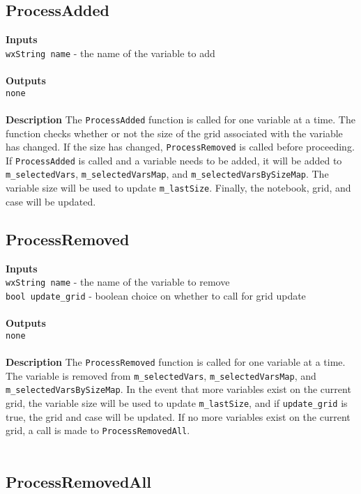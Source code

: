 \documentclass[11pt]{article} %
\begin{document}
\subsection{ProcessAdded}
\textbf{Inputs} \\
\texttt{wxString name} - the name of the variable to add \\
\\
\textbf{Outputs}\\
\texttt{none} \\
\\
\textbf{Description}
The \texttt{ProcessAdded} function is called for one variable at a time. The function checks whether or not the size of the grid associated with the variable has changed.  If the size has changed, \texttt{ProcessRemoved} is called before proceeding. If \texttt{ProcessAdded} is called and a variable needs to be added, it will be added to \texttt{m\_selectedVars}, \texttt{m\_selectedVarsMap}, and \texttt{m\_selectedVarsBySizeMap}. The variable size will be used to update \texttt{m\_lastSize}.  Finally, the notebook, grid, and case will be updated.

\subsection{ProcessRemoved}
\textbf{Inputs} \\
\texttt{wxString name} - the name of the variable to remove \\
\texttt{bool update\_grid} - boolean choice on whether to call for grid update \\
\\
\textbf{Outputs}\\
\texttt{none} \\
\\
\textbf{Description}
The \texttt{ProcessRemoved} function is called for one variable at a time. The variable is removed from \texttt{m\_selectedVars}, \texttt{m\_selectedVarsMap}, and \texttt{m\_selectedVarsBySizeMap}. In the event that more variables exist on the current grid, the variable size will be used to update \texttt{m\_lastSize}, and if \texttt{update\_grid} is true, the grid and case will be updated.  If no more variables exist on the current grid, a call is made to \texttt{ProcessRemovedAll}.\\
\\


\subsection{ProcessRemovedAll}
\end{document}
